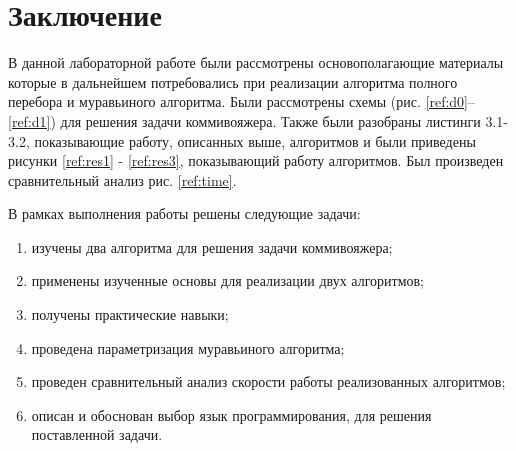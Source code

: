 \chapter*{Заключение}

В данной лабораторной работе были рассмотрены
основополагающие материалы которые в дальнейшем потребовались
при реализации алгоритма полного перебора и муравьиного алгоритма.
Были рассмотрены схемы (рис. \ref{ref:d0}--\ref{ref:d1})
для решения задачи коммивояжера.
Также были разобраны листинги 3.1-3.2,
показывающие работу, описанных выше, алгоритмов и были приведены рисунки
\ref{ref:res1} - \ref{ref:res3},
показывающий работу алгоритмов.
Был произведен сравнительный анализ рис. \ref{ref:time}.


В рамках выполнения работы решены следующие задачи:


\begin{enumerate}
	\item изучены два алгоритма для решения задачи коммивояжера;
	\item применены изученные основы для реализации двух алгоритмов;
	\item получены практические навыки;
	\item проведена параметризация муравьиного алгоритма;
	\item проведен сравнительный анализ скорости работы реализованных алгоритмов;
	\item описан и обоснован выбор язык программирования, для решения поставленной задачи.
\end{enumerate}